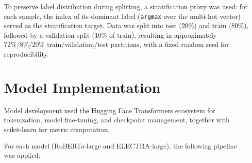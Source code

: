 To preserve label distribution during splitting, a stratification proxy was used: for each sample, the index of its dominant label (\texttt{argmax} over the multi-hot vector) served as the stratification target. Data was split into test (20\%) and train (80\%), followed by a validation split (10\% of train), resulting in approximately 72\%/8\%/20\% train/validation/test partitions, with a fixed random seed for reproducibility.

\section{Model Implementation}
Model development used the Hugging Face Transformers ecosystem \cite{wolf2020transformers} for tokenization, model fine-tuning, and checkpoint management, together with scikit-learn \cite{pedregosa2011scikit} for metric computation.

For each model (\acs{RoBERTa}-large and \acs{ELECTRA}-large), the following pipeline was applied:

